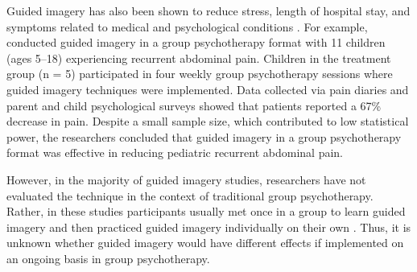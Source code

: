 Guided imagery has also been shown to reduce stress, length of hospital stay, and symptoms related to medical and psychological conditions \citep{scherwitz2005therapy}. For example, \citet{ball2003imagery} conducted guided imagery in a group psychotherapy format with 11 children (ages 5–18) experiencing recurrent abdominal pain. Children in the treatment group (n = 5) participated in four weekly group psychotherapy sessions where guided imagery techniques were implemented. Data collected via pain diaries and parent and child psychological surveys showed that patients reported a 67\% decrease in pain. Despite a small sample size, which contributed to low statistical power, the researchers concluded that guided imagery in a group psychotherapy format was effective in reducing pediatric recurrent abdominal pain.

However, in the majority of guided imagery studies, researchers have not evaluated the technique in the context of traditional group psychotherapy. Rather, in these studies participants usually met once in a group to learn guided imagery and then practiced guided imagery individually on their own \citep[see][for more]{menzies2012imagery}. Thus, it is unknown whether guided imagery would have different effects if implemented on an ongoing basis in group psychotherapy.
